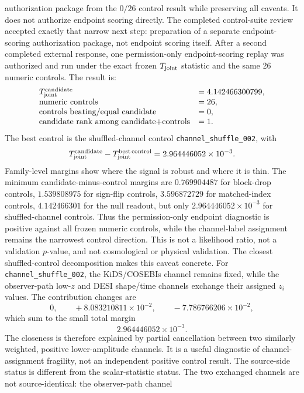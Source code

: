 \documentclass[11pt]{article}
\begin{document}
authorization package from the \(0/26\) control result while preserving all
caveats.  It does not authorize endpoint scoring directly.
The completed control-suite review accepted exactly that narrow next step:
preparation of a separate endpoint-scoring authorization package, not endpoint
scoring itself.  After a second completed external response, one
permission-only endpoint-scoring replay was authorized and run under the exact
frozen \(T_{\rm joint}\) statistic and the same 26 numeric controls.  The
result is:
\[
\begin{array}{ll}
T_{\rm joint}^{\rm candidate} &= 4.142466300799,\\
\text{numeric controls} &= 26,\\
\text{controls beating/equal candidate} &= 0,\\
\text{candidate rank among candidate+controls} &= 1.
\end{array}
\]
The best control is the shuffled-channel control
\texttt{channel\_\allowbreak{}shuffle\_\allowbreak{}002}, with
\[
T_{\rm joint}^{\rm candidate}
-
T_{\rm joint}^{\rm best\,control}
=
2.964446052\times 10^{-3}.
\]
Family-level margins show where the signal is robust and where it is thin.
The minimum candidate-minus-control margins are \(0.769904487\) for
block-drop controls, \(1.539808975\) for sign-flip controls,
\(3.596872729\) for matched-index controls, \(4.142466301\) for the null
readout, but only \(2.964446052\times10^{-3}\) for shuffled-channel controls.
Thus the permission-only endpoint diagnostic is positive against all frozen
numeric controls, while the channel-label assignment remains the narrowest
control direction.  This is not a likelihood ratio, not a validation \(p\)-value,
and not cosmological or physical validation.
The closest shuffled-control decomposition makes this caveat concrete.
For \texttt{channel\_\allowbreak{}shuffle\_\allowbreak{}002}, the KiDS/COSEBIs channel remains fixed,
while the observer-path low-\(z\) and DESI shape/time channels exchange their
assigned \(z_i\) values.  The contribution changes are
\[
0,\qquad
+8.083210811\times10^{-2},\qquad
-7.786766206\times10^{-2},
\]
which sum to the small total margin
\[
2.964446052\times10^{-3}.
\]
The closeness is therefore explained by partial cancellation between two
similarly weighted, positive lower-amplitude channels.  It is a useful
diagnostic of channel-assignment fragility, not an independent positive
control result.
The source-side status is different from the scalar-statistic status.  The
two exchanged channels are not source-identical: the observer-path channel
\end{document}
